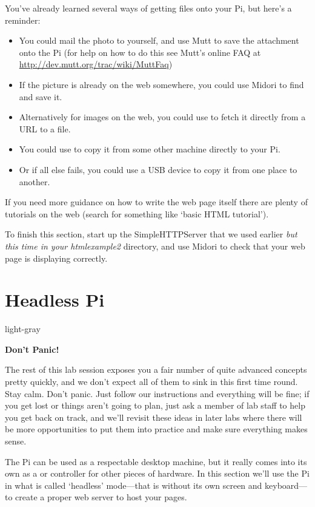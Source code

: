 You've already learned several ways of getting files onto your Pi, but here's a reminder:
\begin{itemize}
\item You could mail the photo to yourself, and use Mutt to save the attachment onto the Pi (for help on how to do this see Mutt's online FAQ at \url{http://dev.mutt.org/trac/wiki/MuttFaq})
\item If the picture is already on the web somewhere, you could use Midori to find and save it. 
\item Alternatively for images on the web, you could use  to fetch it directly from a URL to a file. 
\item You could use  to copy it from some other machine directly to your Pi. 
\item Or if all else fails, you could use a USB device to copy it from one place to another. 
\end{itemize}

If you need more guidance on how to write the web page itself there are plenty of tutorials on the web (search for something like `basic HTML tutorial').

To finish this section, start up the SimpleHTTPServer that we used earlier \textit{but this time in your htmlexample2} directory, and use Midori to check that your web page is displaying correctly.

\FloatBarrier

\section{Headless Pi}
\label{section:headless}

\begin{stdframe}{light-gray}%
  \centerline{\textbf{Don't Panic!}}
The rest of this lab session exposes you a fair number of quite advanced concepts pretty quickly, and we don't expect all of them to sink in this first time round. Stay calm.  Don't panic. Just follow our instructions and everything will be fine; if you get lost or things aren't going to plan, just ask a member of lab staff to help you get back on track, and we'll revisit these ideas in later labs where there will be more opportunities to put them into practice and make sure everything makes sense.
\end{stdframe}

The Pi can be used as a respectable desktop machine, but it really comes into its own as a  or controller for other pieces of hardware. In this section we'll use the Pi in what is called `headless' mode---that is without its own screen and keyboard---to create a proper web server to host your pages. 

